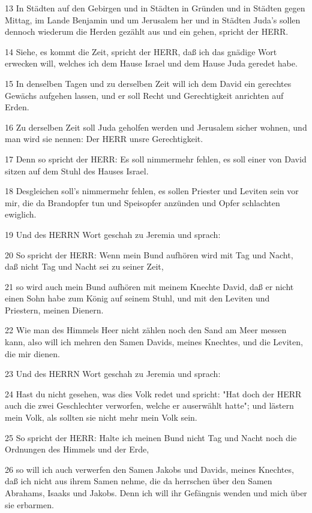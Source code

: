 \par 13 In Städten auf den Gebirgen und in Städten in Gründen und in Städten gegen Mittag, im Lande Benjamin und um Jerusalem her und in Städten Juda's sollen dennoch wiederum die Herden gezählt aus und ein gehen, spricht der HERR.
\par 14 Siehe, es kommt die Zeit, spricht der HERR, daß ich das gnädige Wort erwecken will, welches ich dem Hause Israel und dem Hause Juda geredet habe.
\par 15 In denselben Tagen und zu derselben Zeit will ich dem David ein gerechtes Gewächs aufgehen lassen, und er soll Recht und Gerechtigkeit anrichten auf Erden.
\par 16 Zu derselben Zeit soll Juda geholfen werden und Jerusalem sicher wohnen, und man wird sie nennen: Der HERR unsre Gerechtigkeit.
\par 17 Denn so spricht der HERR: Es soll nimmermehr fehlen, es soll einer von David sitzen auf dem Stuhl des Hauses Israel.
\par 18 Desgleichen soll's nimmermehr fehlen, es sollen Priester und Leviten sein vor mir, die da Brandopfer tun und Speisopfer anzünden und Opfer schlachten ewiglich.
\par 19 Und des HERRN Wort geschah zu Jeremia und sprach:
\par 20 So spricht der HERR: Wenn mein Bund aufhören wird mit Tag und Nacht, daß nicht Tag und Nacht sei zu seiner Zeit,
\par 21 so wird auch mein Bund aufhören mit meinem Knechte David, daß er nicht einen Sohn habe zum König auf seinem Stuhl, und mit den Leviten und Priestern, meinen Dienern.
\par 22 Wie man des Himmels Heer nicht zählen noch den Sand am Meer messen kann, also will ich mehren den Samen Davids, meines Knechtes, und die Leviten, die mir dienen.
\par 23 Und des HERRN Wort geschah zu Jeremia und sprach:
\par 24 Hast du nicht gesehen, was dies Volk redet und spricht: "Hat doch der HERR auch die zwei Geschlechter verworfen, welche er auserwählt hatte"; und lästern mein Volk, als sollten sie nicht mehr mein Volk sein.
\par 25 So spricht der HERR: Halte ich meinen Bund nicht Tag und Nacht noch die Ordnungen des Himmels und der Erde,
\par 26 so will ich auch verwerfen den Samen Jakobs und Davids, meines Knechtes, daß ich nicht aus ihrem Samen nehme, die da herrschen über den Samen Abrahams, Isaaks und Jakobs. Denn ich will ihr Gefängnis wenden und mich über sie erbarmen.

